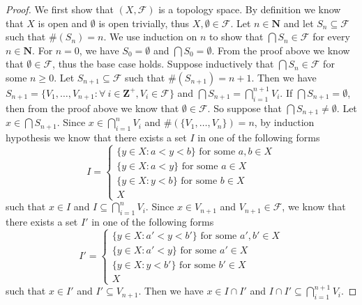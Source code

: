 \begin{proof}
    We first show that \((X, \mathcal{F})\) is a topology space.
    By definition we know that \(X\) is open and \(\emptyset\) is open trivially, thus \(X, \emptyset \in \mathcal{F}\).
    Let \(n \in \mathbf{N}\) and let \(S_n \subseteq \mathcal{F}\) such that \(\#(S_n) = n\).
    We use induction on \(n\) to show that \(\bigcap S_n \in \mathcal{F}\) for every \(n \in \mathbf{N}\).
    For \(n = 0\), we have \(S_0 = \emptyset\) and \(\bigcap S_0 = \emptyset\).
    From the proof above we know that \(\emptyset \in \mathcal{F}\), thus the base case holds.
    Suppose inductively that \(\bigcap S_n \in \mathcal{F}\) for some \(n \geq 0\).
    Let \(S_{n + 1} \subseteq \mathcal{F}\) such that \(\#(S_{n + 1}) = n + 1\).
    Then we have \(S_{n + 1} = \{V_1, \dots, V_{n + 1} : \forall\ i \in \mathbf{Z}^+, V_i \in \mathcal{F}\}\) and \(\bigcap S_{n + 1} = \bigcap_{i = 1}^{n + 1} V_i\).
    If \(\bigcap S_{n + 1} = \emptyset\), then from the proof above we know that \(\emptyset \in \mathcal{F}\).
    So suppose that \(\bigcap S_{n + 1} \neq \emptyset\).
    Let \(x \in \bigcap S_{n + 1}\).
    Since \(x \in \bigcap_{i = 1}^n V_i\) and \(\#(\{V_1, \dots, V_n\}) = n\), by induction hypothesis we know that there exists a set \(I\) in one of the following forms
    \[
        I = \begin{cases}
            \{y \in X : a < y < b\} \text{ for some } a, b \in X \\
            \{y \in X : a < y\} \text{ for some } a \in X        \\
            \{y \in X : y < b\} \text{ for some } b \in X        \\
            X
        \end{cases}
    \]
    such that \(x \in I\) and \(I \subseteq \bigcap_{i = 1}^n V_i\).
    Since \(x \in V_{n + 1}\) and \(V_{n + 1} \in \mathcal{F}\), we know that there exists a set \(I'\) in one of the following forms
    \[
        I' = \begin{cases}
            \{y \in X : a' < y < b'\} \text{ for some } a', b' \in X \\
            \{y \in X : a' < y\} \text{ for some } a' \in X          \\
            \{y \in X : y < b'\} \text{ for some } b' \in X          \\
            X
        \end{cases}
    \]
    such that \(x \in I'\) and \(I' \subseteq V_{n + 1}\).
    Then we have \(x \in I \cap I'\) and \(I \cap I' \subseteq \bigcap_{i = 1}^{n + 1} V_i\).

\end{proof}
